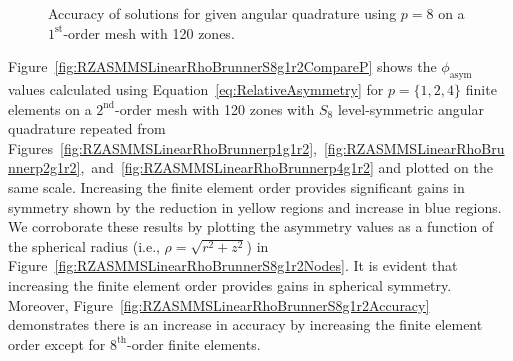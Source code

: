 \documentclass[12pt,letterpaper]{article}
\begin{document}
\begin{figure}[!htb]
\centering
{}
\caption{Accuracy of solutions for given angular quadrature using $p=8$ on a $1^\text{st}$-order mesh with 120 zones.}
\label{fig:RZASMMSLinearRhoBrunnerp8g1r2Accuracy}
\end{figure}

\FloatBarrier

Figure~\ref{fig:RZASMMSLinearRhoBrunnerS8g1r2CompareP} shows the $\phi_\text{asym}$ values calculated using Equation~\ref{eq:RelativeAsymmetry} for $p=\{1,2,4\}$ finite elements on a $2^\text{nd}$-order mesh with 120 zones with $S_8$ level-symmetric angular quadrature repeated from Figures~\ref{fig:RZASMMSLinearRhoBrunnerp1g1r2},~\ref{fig:RZASMMSLinearRhoBrunnerp2g1r2},~and~\ref{fig:RZASMMSLinearRhoBrunnerp4g1r2} and plotted on the same scale. Increasing the finite element order provides significant gains in symmetry shown by the reduction in yellow regions and increase in blue regions. We corroborate these results by plotting the asymmetry values as a function of the spherical radius (i.e., $\rho=\sqrt{r^2+z^2}$) in Figure~\ref{fig:RZASMMSLinearRhoBrunnerS8g1r2Nodes}. It is evident that increasing the finite element order provides gains in spherical symmetry. Moreover, Figure~\ref{fig:RZASMMSLinearRhoBrunnerS8g1r2Accuracy} demonstrates there is an increase in accuracy by increasing the finite element order except for $8^\text{th}$-order finite elements.
\end{document}
